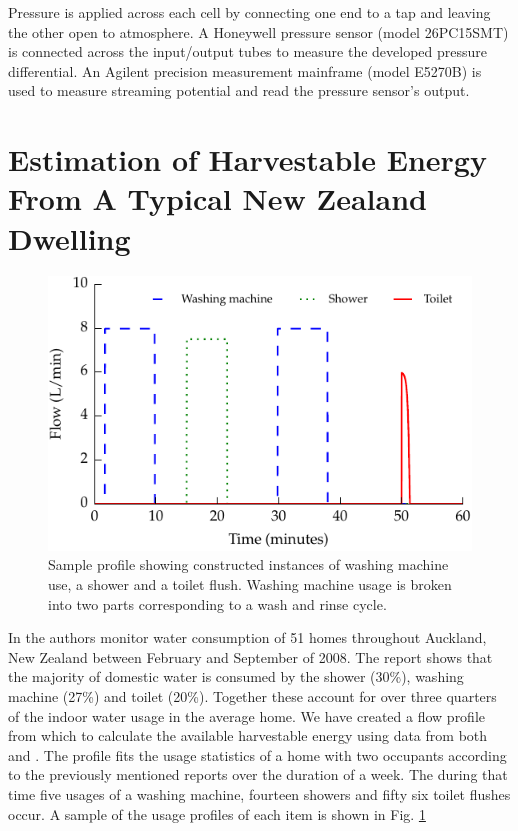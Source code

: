 \documentclass[10pt,final,journal]{IEEEtran}
\begin{document}
    Pressure is applied across each cell by connecting one end to a tap and leaving the other open to atmosphere.
    A Honeywell pressure sensor (model 26PC15SMT) is connected across the input/output tubes to measure the developed pressure differential.
    An Agilent precision measurement mainframe (model E5270B) is used to measure streaming potential and read the pressure sensor's output.

    \section{Estimation of Harvestable Energy From A Typical New Zealand Dwelling}
    \label{sect:waterConsumption}
    \begin{figure}
        \begin{center}
        \includegraphics[width=\linewidth]{graph_profile.pdf}
        \end{center}
        \caption{Sample profile showing constructed instances of washing machine use, a shower and a toilet flush.
        Washing machine usage is broken into two parts corresponding to a wash and rinse cycle.}
        \label{fig:profileSample}
    \end{figure}

    In \cite{Heinrich2008} the authors monitor water consumption of 51 homes throughout Auckland, New Zealand between February and September of 2008.
    The report shows that the majority of domestic water is consumed by the shower (30\%), washing machine (27\%) and toilet (20\%).
    Together these account for over three quarters of the indoor water usage in the average home.
    We have created a flow profile from which to calculate the available harvestable energy using data from both \cite{Heinrich2008} and \cite{Heinrich2007}.
    The profile fits the usage statistics of a home with two occupants according to the previously mentioned reports over the duration of a week.
    The during that time five usages of a washing machine, fourteen showers and fifty six toilet flushes occur.
    A sample of the usage profiles of each item is shown in Fig. \ref{fig:profileSample}
\end{document}
